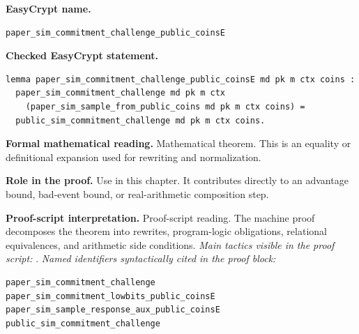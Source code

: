 \begin{formaltheorem}
\noindent\textbf{EasyCrypt name.}
\begin{lstlisting}[language=EasyCrypt,basicstyle=\ttfamily\scriptsize]
paper_sim_commitment_challenge_public_coinsE
\end{lstlisting}
\noindent\textbf{Checked EasyCrypt statement.}
\begin{lstlisting}[language=EasyCrypt,basicstyle=\ttfamily\scriptsize]
lemma paper_sim_commitment_challenge_public_coinsE md pk m ctx coins :
  paper_sim_commitment_challenge md pk m ctx
    (paper_sim_sample_from_public_coins md pk m ctx coins) =
  public_sim_commitment_challenge md pk m ctx coins.
\end{lstlisting}
\noindent\textbf{Formal mathematical reading.}
Mathematical theorem. This is an equality or definitional expansion used for rewriting and normalization.

\noindent\textbf{Role in the proof.}
Use in this chapter. It contributes directly to an advantage bound, bad-event bound, or real-arithmetic composition step.

\noindent\textbf{Proof-script interpretation.}
Proof-script reading. The machine proof decomposes the theorem into rewrites, program-logic obligations, relational equivalences, and arithmetic side conditions.
\emph{Main tactics visible in the proof script:} .
\emph{Named identifiers syntactically cited in the proof block:}
\begin{lstlisting}[language=EasyCrypt,basicstyle=\ttfamily\scriptsize]
paper_sim_commitment_challenge
paper_sim_commitment_lowbits_public_coinsE
paper_sim_sample_response_aux_public_coinsE
public_sim_commitment_challenge
\end{lstlisting}

\end{formaltheorem}

